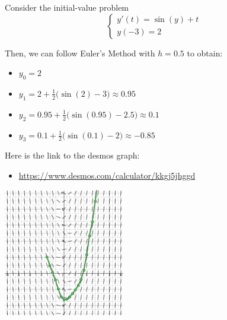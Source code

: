 \begin{example}
Consider the initial-value problem
$$
\begin{cases}
y'(t) = \sin(y)+t \\
y(-3)=2
\end{cases}
$$

\begin{minipage}{.65\textwidth}
Then, we can follow Euler's Method with $h=0.5$ to obtain:
\begin{itemize}
	\item $y_0=2$
	\item $y_1 = 2 + \frac12 \big(\sin(2) -3\big) \approx 0.95$
	\item $y_2 = 0.95 + \frac12 \big(\sin(0.95) -2.5\big) \approx 0.1$
	\item $y_3 = 0.1 + \frac12 \big(\sin(0.1) -2\big) \approx -0.85$
\end{itemize}

	
\begin{minipage}{220pt}
Here is the link to the desmos graph: 
\begin{itemize}
	\item \href{https://www.desmos.com/calculator/kkgj5jhggd}{https://www.desmos.com/calculator/kkgj5jhggd} %
\end{itemize}
\end{minipage}
\hfill
\begin{minipage}{55pt}
\end{minipage}
\end{minipage}
\hfill
\begin{minipage}{150pt}
	\includegraphics*[width=150pt]{images/module10-Euler.pdf}
\end{minipage}	

\end{example}


